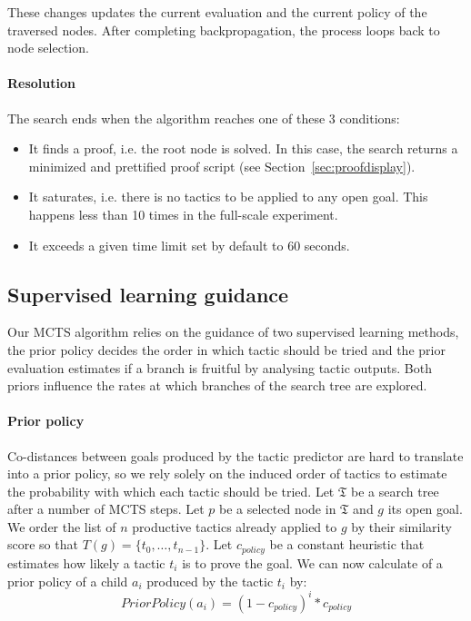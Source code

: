 \documentclass[runningheads,a4paper,draft]{svjour3}
\begin{document}
These changes updates the current evaluation and the current policy of the
traversed nodes.
After completing backpropagation, the process loops back to node
selection.

\paragraph{Resolution}
The search ends when the algorithm reaches one of these 3 conditions:
\begin{itemize}
\item It finds a proof, i.e. the root node is solved. In this case,
the search returns a minimized and
prettified proof script (see Section~\ref{sec:proofdisplay}).
\item It saturates, i.e. there is no tactics to be applied to any open goal.
This happens less than 10 times in the full-scale experiment.
\item It exceeds a given time limit set by default to 60 seconds.
\end{itemize}

\subsection{Supervised learning guidance}
Our MCTS algorithm relies on the guidance of two supervised learning methods,
the prior policy decides the order in which tactic should be tried and the 
prior evaluation estimates if a branch is fruitful by analysing tactic 
outputs. Both priors influence the rates at which branches of the search tree 
are explored. 

\paragraph{Prior policy}\label{sec:policy}
Co-distances between goals produced by the tactic predictor are hard
to translate into a prior policy, so we rely solely on the induced order of
tactics to estimate the probability with which each tactic should be tried.
Let $\mathfrak{T}$ be a search tree after a number of MCTS steps.
Let $p$ be a selected node in $\mathfrak{T}$ and $g$ its open goal. We order 
the list of $n$ productive tactics already
applied to $g$ by their similarity score so that $T(g)= \lbrace
t_0,\ldots,t_{n-1} \rbrace$.
Let $c_{policy}$ be a constant heuristic that estimates how likely a tactic
$t_i$ is to prove the goal.
We can now calculate of a prior policy of a child $a_i$ produced by the tactic
$t_i$ by:
\[PriorPolicy(a_i) = (1 - c_{policy})^{i} * c_{policy}\]
\end{document}
